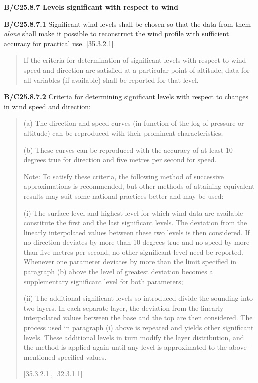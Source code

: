 \textbf{B/C25.8.7 Levels significant with respect to wind}

\textbf{B/C25.8.7.1} Significant wind levels shall be chosen so that the data from them \emph{alone} shall make it possible to reconstruct the wind profile with sufficient accuracy for practical use. {[}35.3.2.1{]}

\begin{quote}
If the criteria for determination of significant levels with respect to wind speed and direction are satisfied at a particular point of altitude, data for all variables (if available) shall be reported for that level.
\end{quote}

\textbf{B/C25.8.7.2} Criteria for determining significant levels with respect to changes in wind speed and direction:

\begin{quote}
(a) The direction and speed curves (in function of the log of pressure or altitude) can be reproduced with their prominent characteristics;

(b) These curves can be reproduced with the accuracy of at least 10 degrees true for direction and five metres per second for speed.

Note: To satisfy these criteria, the following method of successive approximations is recommended, but other methods of attaining equivalent results may suit some national practices better and may be used:

(i) The surface level and highest level for which wind data are available constitute the first and the last significant levels. The deviation from the linearly interpolated values between these two levels is then considered. If no direction deviates by more than 10 degrees true and no speed by more than five metres per second, no other significant level need be reported. Whenever one parameter deviates by more than the limit specified in paragraph (b) above the level of greatest deviation becomes a supplementary significant level for both parameters;

(ii) The additional significant levels so introduced divide the sounding into two layers. In each separate layer, the deviation from the linearly interpolated values between the base and the top are then considered. The process used in paragraph (i) above is repeated and yields other significant levels. These additional levels in turn modify the layer distribution, and the method is applied again until any level is approximated to the above-mentioned specified values.

{[}35.3.2.1{]}, {[}32.3.1.1{]}
\end{quote}

